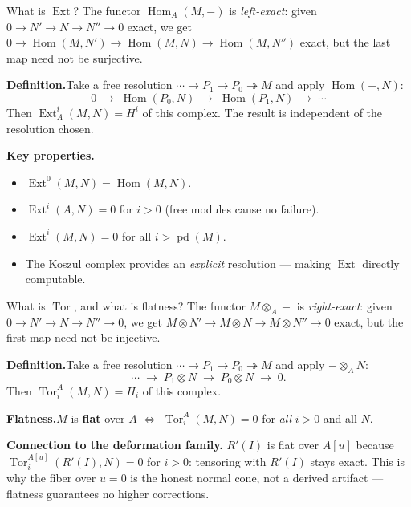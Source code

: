 \documentclass[aspectratio=169,12pt]{beamer}
\begin{document}
\begin{frame}{What is $\operatorname{Ext}$?}
  The functor $\operatorname{Hom}_A(M, -)$ is \emph{left-exact}: given
  $0 \to N' \to N \to N'' \to 0$ exact, we get
  $0 \to \operatorname{Hom}(M,N') \to \operatorname{Hom}(M,N) \to \operatorname{Hom}(M,N'')$
  exact, but the last map need not be surjective.

  \medskip

  \textbf{Definition.}\enspace Take a free resolution
  $\cdots \to P_1 \to P_0 \twoheadrightarrow M$ and apply $\operatorname{Hom}(-, N)$:
  \[
    0 \;\to\; \operatorname{Hom}(P_0, N)
      \;\to\; \operatorname{Hom}(P_1, N)
      \;\to\; \cdots
  \]
  Then $\operatorname{Ext}^i_A(M, N) = H^i$ of this complex.
  The result is independent of the resolution chosen.

  \medskip

  \textbf{Key properties.}
  \begin{itemize}
    \item $\operatorname{Ext}^0(M, N) = \operatorname{Hom}(M, N)$.
    \item $\operatorname{Ext}^i(A, N) = 0$ for $i > 0$
          \;(free modules cause no failure).
    \item $\operatorname{Ext}^i(M, N) = 0$ for all $i > \operatorname{pd}(M)$.
    \item The Koszul complex provides an \emph{explicit} resolution —
          making $\operatorname{Ext}$ directly computable.
  \end{itemize}
\end{frame}

\begin{frame}{What is $\operatorname{Tor}$, and what is flatness?}
  The functor $M \otimes_A -$ is \emph{right-exact}: given
  $0 \to N' \to N \to N'' \to 0$, we get
  $M \otimes N' \to M \otimes N \to M \otimes N'' \to 0$ exact,
  but the first map need not be injective.

  \medskip

  \textbf{Definition.}\enspace Take a free resolution $\cdots \to P_1 \to P_0
  \twoheadrightarrow M$ and apply $- \otimes_A N$:
  \[
    \cdots \;\to\; P_1 \otimes N \;\to\; P_0 \otimes N \;\to\; 0.
  \]
  Then $\operatorname{Tor}_i^A(M, N) = H_i$ of this complex.

  \medskip

  \textbf{Flatness.}\enspace $M$ is \textbf{flat} over $A$
  $\Longleftrightarrow$
  $\operatorname{Tor}_i^A(M, N) = 0$ for \emph{all} $i > 0$ and all $N$.

  \medskip

  \textbf{Connection to the deformation family.}\enspace
  $R'(I)$ is flat over $A[u]$ because
  $\operatorname{Tor}_i^{A[u]}(R'(I), N) = 0$ for $i > 0$:
  tensoring with $R'(I)$ stays exact.
  This is why the fiber over $u = 0$ is the honest normal cone,
  not a derived artifact — flatness guarantees no higher corrections.
\end{frame}
\end{document}
